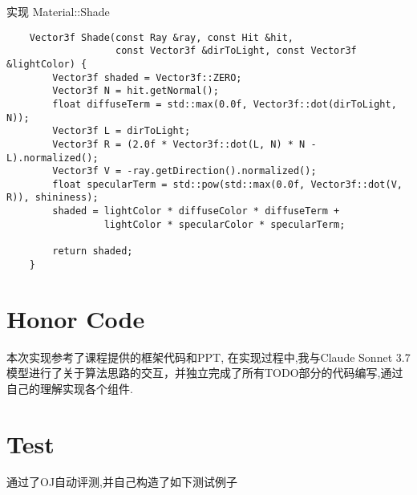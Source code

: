 \documentclass[a4paper,twoside]{article}
\begin{document}
\begin{listing}[H]
    \caption{实现 Material::Shade}
    \label{code:material_shade}
    \begin{verbatim}
    Vector3f Shade(const Ray &ray, const Hit &hit,
                   const Vector3f &dirToLight, const Vector3f &lightColor) {
        Vector3f shaded = Vector3f::ZERO;
        Vector3f N = hit.getNormal();
        float diffuseTerm = std::max(0.0f, Vector3f::dot(dirToLight, N));
        Vector3f L = dirToLight;
        Vector3f R = (2.0f * Vector3f::dot(L, N) * N - L).normalized();
        Vector3f V = -ray.getDirection().normalized();
        float specularTerm = std::pow(std::max(0.0f, Vector3f::dot(V, R)), shininess);
        shaded = lightColor * diffuseColor * diffuseTerm + 
                 lightColor * specularColor * specularTerm;
        
        return shaded;
    }
    \end{verbatim}
\end{listing}

\section{Honor Code}
本次实现参考了课程提供的框架代码和PPT, 在实现过程中,我与Claude Sonnet 3.7模型进行了关于算法思路的交互，并独立完成了所有TODO部分的代码编写,通过自己的理解实现各个组件.
\section{Test}
通过了OJ自动评测,并自己构造了如下测试例子
\end{document}
